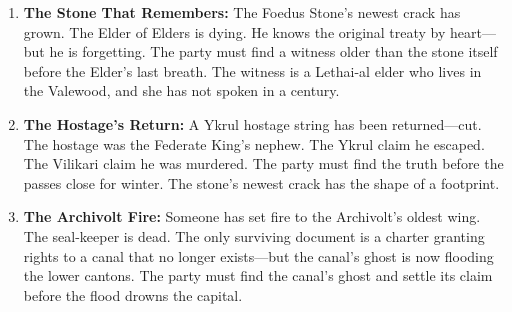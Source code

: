 \begin{enumerate}
  \item \textbf{The Stone That Remembers:} The Foedus Stone's newest crack has grown. The Elder of Elders is dying. He knows the original treaty by heart---but he is forgetting. The party must find a witness older than the stone itself before the Elder's last breath. The witness is a Lethai-al elder who lives in the Valewood, and she has not spoken in a century.

  \item \textbf{The Hostage's Return:} A Ykrul hostage string has been returned---cut. The hostage was the Federate King's nephew. The Ykrul claim he escaped. The Vilikari claim he was murdered. The party must find the truth before the passes close for winter. The stone's newest crack has the shape of a footprint.

  \item \textbf{The Archivolt Fire:} Someone has set fire to the Archivolt's oldest wing. The seal-keeper is dead. The only surviving document is a charter granting rights to a canal that no longer exists---but the canal's ghost is now flooding the lower cantons. The party must find the canal's ghost and settle its claim before the flood drowns the capital.
\end{enumerate}

